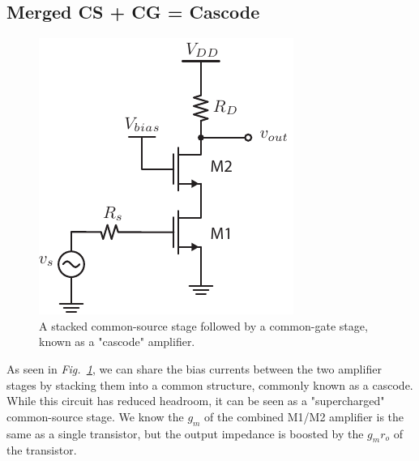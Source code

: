 \subsection{Merged CS + CG = Cascode}
\begin{figure}[tb]
\centering
\includegraphics[scale=1]{10cascode_dc}
\caption{A stacked common-source stage followed by a common-gate stage, known as a "cascode" amplifier.}
\label{fig:10cascode_dc}
\end{figure}
As seen in \emph{Fig.~\ref{fig:10cascode_dc}}, we can share the bias currents between the two amplifier stages by stacking them into a common structure, commonly known as a cascode.  While this circuit has reduced headroom, it can be seen as a "supercharged" common-source stage.  We know the $g_m$ of the combined M1/M2 amplifier is the same as a single transistor, but the output impedance is boosted by the $g_m r_o$ of the transistor.
